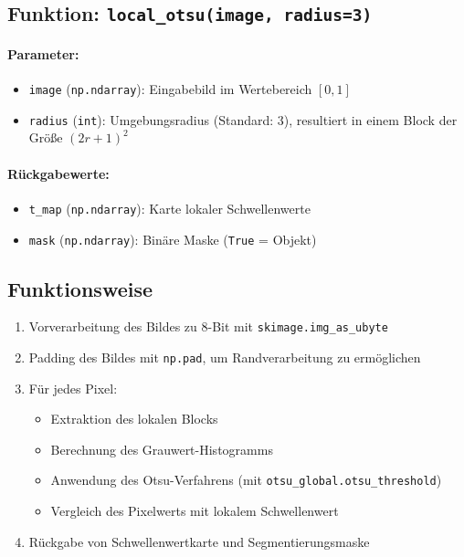 \documentclass[a4paper,12pt]{article}
\begin{document}
\subsection*{Funktion: \texttt{local\_otsu(image, radius=3)}}

\paragraph{Parameter:}
\begin{itemize}
  \item \texttt{image} (\texttt{np.ndarray}): Eingabebild im Wertebereich $[0, 1]$
  \item \texttt{radius} (\texttt{int}): Umgebungsradius (Standard: 3), resultiert in einem Block der Größe $(2r + 1)^2$
\end{itemize}

\paragraph{Rückgabewerte:}
\begin{itemize}
  \item \texttt{t\_map} (\texttt{np.ndarray}): Karte lokaler Schwellenwerte
  \item \texttt{mask} (\texttt{np.ndarray}): Binäre Maske (\texttt{True} = Objekt)
\end{itemize}

\subsection*{Funktionsweise}

\begin{enumerate}
  \item Vorverarbeitung des Bildes zu 8-Bit mit \texttt{skimage.img\_as\_ubyte}
  \item Padding des Bildes mit \texttt{np.pad}, um Randverarbeitung zu ermöglichen
  \item Für jedes Pixel:
  \begin{itemize}
    \item Extraktion des lokalen Blocks
    \item Berechnung des Grauwert-Histogramms
    \item Anwendung des Otsu-Verfahrens (mit \texttt{otsu\_global.otsu\_threshold})
    \item Vergleich des Pixelwerts mit lokalem Schwellenwert
  \end{itemize}
  \item Rückgabe von Schwellenwertkarte und Segmentierungsmaske
\end{enumerate}
\end{document}
